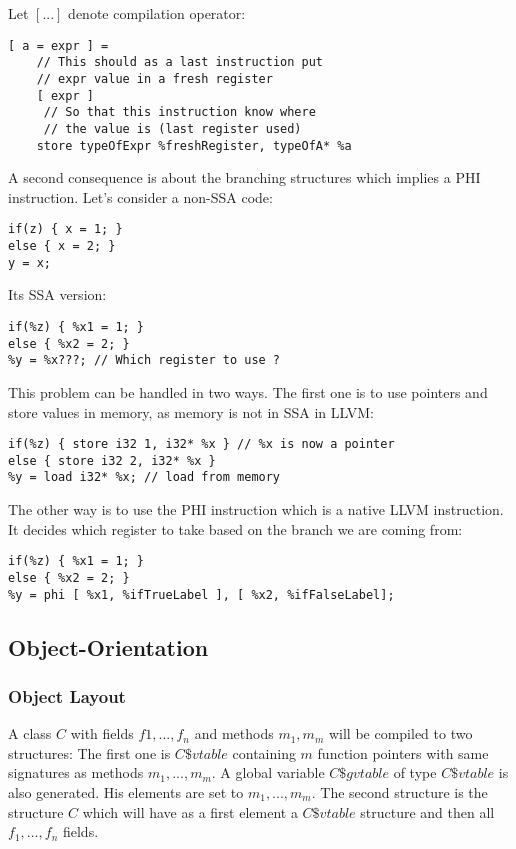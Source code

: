 Let $[ ... ]$ denote compilation operator:
\begin{lstlisting}
[ a = expr ] = 
    // This should as a last instruction put
    // expr value in a fresh register
    [ expr ]
     // So that this instruction know where
     // the value is (last register used)
    store typeOfExpr %freshRegister, typeOfA* %a
\end{lstlisting}

A second consequence is about the branching structures which implies a PHI instruction. Let's consider a non-SSA code:
\begin{lstlisting}
if(z) { x = 1; } 
else { x = 2; }
y = x;
\end{lstlisting}

Its SSA version:
\begin{lstlisting}
if(%z) { %x1 = 1; } 
else { %x2 = 2; }
%y = %x???; // Which register to use ?
\end{lstlisting}

This problem can be handled in two ways. The first one is to use pointers and store values in memory, as memory is not in SSA in LLVM:
\begin{lstlisting}
if(%z) { store i32 1, i32* %x } // %x is now a pointer
else { store i32 2, i32* %x }
%y = load i32* %x; // load from memory
\end{lstlisting}

The other way is to use the PHI instruction which is a native LLVM instruction. It decides which register to take based on the branch we are coming from:
\begin{lstlisting}
if(%z) { %x1 = 1; } 
else { %x2 = 2; }
%y = phi [ %x1, %ifTrueLabel ], [ %x2, %ifFalseLabel];
\end{lstlisting}

\subsection{Object-Orientation}
\subsubsection{Object Layout}
A class $C$ with fields $f1, ..., f_n$ and methods $m_1, m_m$ will be compiled to two structures: The first one is $C\$vtable$ containing $m$ function pointers with same signatures as methods $m_1, ..., m_m$. A global variable $C\$gvtable$ of type $C\$vtable$ is also generated. His elements are set to $m_1, ..., m_m$. The second structure is the structure $C$ which will have as a first element a $C\$vtable$ structure and then all $f_1, ..., f_n$ fields.


